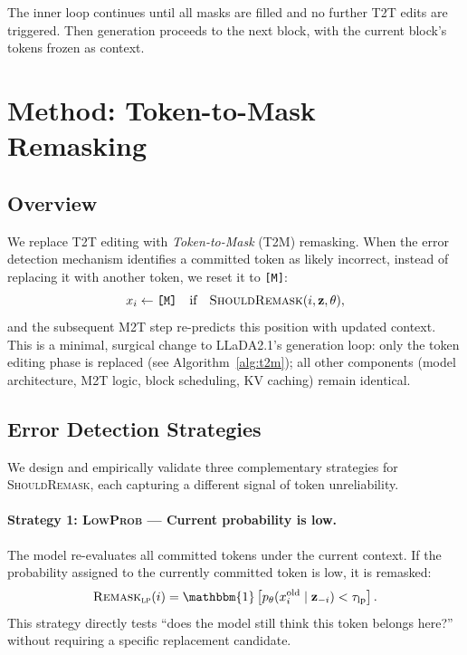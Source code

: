 \documentclass{article}
\newcommand{\mask}{\texttt{[M]}}
\newcommand{\MtoT}{\textrm{M2T}}
\newcommand{\TtoT}{\textrm{T2T}}
\newcommand{\TtoM}{\textrm{T2M}}
\newcommand{\xold}{x_i^{\mathrm{old}}}
\begin{document}
The inner loop continues until all masks are filled and no further \TtoT{} edits are triggered. Then generation proceeds to the next block, with the current block's tokens frozen as context.

\section{Method: Token-to-Mask Remasking}
\label{sec:method}

\subsection{Overview}

We replace \TtoT{} editing with \emph{Token-to-Mask} (\TtoM{}) remasking. When the error detection mechanism identifies a committed token as likely incorrect, instead of replacing it with another token, we reset it to \mask{}:
\begin{equation}
    x_i \leftarrow \mask{} \quad \text{if} \quad \textsc{ShouldRemask}(i, \mathbf{z}, \theta),
    \label{eq:t2m}
\end{equation}
and the subsequent \MtoT{} step re-predicts this position with updated context. This is a minimal, surgical change to LLaDA2.1's generation loop: only the token editing phase is replaced (see Algorithm~\ref{alg:t2m}); all other components (model architecture, \MtoT{} logic, block scheduling, KV caching) remain identical.

\subsection{Error Detection Strategies}

We design and empirically validate three complementary strategies for \textsc{ShouldRemask}, each capturing a different signal of token unreliability.

\paragraph{Strategy 1: \textsc{LowProb} --- Current probability is low.}
The model re-evaluates all committed tokens under the current context. If the probability assigned to the currently committed token is low, it is remasked:
\begin{equation}
    \textsc{Remask}_{\textsc{lp}}(i) = \mathbbm{1}\left[p_\theta(\xold \mid \mathbf{z}_{-i}) < \tau_{\text{lp}}\right].
    \label{eq:low_prob}
\end{equation}
This strategy directly tests ``does the model still think this token belongs here?'' without requiring a specific replacement candidate.
\end{document}
